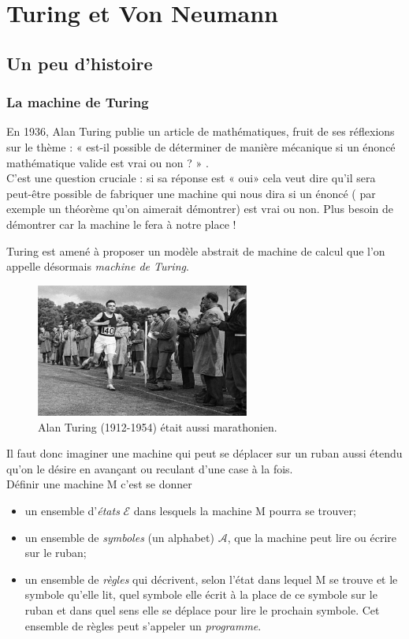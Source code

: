 \chapter{Turing et Von Neumann}

\section{Un peu d'histoire}
\subsection{La machine de Turing}

En 1936, Alan Turing publie un article de mathématiques, fruit de ses réflexions sur le thème : « est-il possible de déterminer de manière
mécanique si un énoncé mathématique valide est vrai ou non ? » .\\
C'est une question cruciale : si sa réponse est « oui»  cela veut dire qu'il sera peut-être possible de fabriquer une machine qui nous dira si
un énoncé ( par exemple un théorème qu'on aimerait démontrer) est vrai ou non. Plus besoin de démontrer car la machine le fera à notre place !

Turing est amené à proposer un modèle abstrait de machine de calcul que l'on appelle désormais \textit{machine de Turing}.

\begin{figure}[H]
\begin{center}
\includegraphics[width=7cm]{ch-turing/img/turing}
\end{center}
\caption*{Alan Turing (1912-1954) était aussi marathonien.}
\end{figure}

Il faut donc imaginer une machine qui peut se déplacer sur un ruban aussi étendu qu'on le désire en avançant ou reculant d'une case à la fois.\\
Définir une machine M c'est se donner
\begin{itemize}
    \item 	un ensemble d'\textit{états} $\mathcal{E}$ dans lesquels la machine M pourra se trouver;
    \item 	un ensemble de \textit{symboles} (un alphabet) $\mathcal{A}$, que la machine peut lire ou écrire sur le ruban;
    \item 	un ensemble de \textit{règles} qui décrivent, selon l'état dans lequel M se trouve et le symbole qu'elle lit, quel symbole elle écrit à
          la place de ce symbole sur le ruban et dans quel sens elle se déplace pour lire le prochain symbole. Cet ensemble de règles peut s'appeler un
          \textit{programme}.
\end{itemize}

